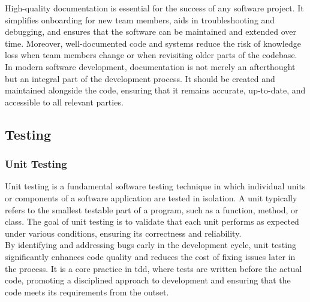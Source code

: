 High-quality documentation is essential for the success of any software project. It simplifies onboarding for new team members, aids in troubleshooting and debugging, and ensures that the software can be maintained and extended over time. Moreover, well-documented code and systems reduce the risk of knowledge loss when team members change or when revisiting older parts of the codebase. \cite{geeksforgeeks:doc} \\

In modern software development, documentation is not merely an afterthought but an integral part of the development process. It should be created and maintained alongside the code, ensuring that it remains accurate, up-to-date, and accessible to all relevant parties.

\subsection{Testing}

\subsubsection*{Unit Testing}



Unit testing is a fundamental software testing technique in which individual units or components of a software application are tested in isolation. A unit typically refers to the smallest testable part of a program, such as a function, method, or class. The goal of unit testing is to validate that each unit performs as expected under various conditions, ensuring its correctness and reliability. \cite{geeksforgeeks:unit-test} \\

By identifying and addressing bugs early in the development cycle, unit testing significantly enhances code quality and reduces the cost of fixing issues later in the process. It is a core practice in \gls{tdd}, where tests are written before the actual code, promoting a disciplined approach to development and ensuring that the code meets its requirements from the outset. \cite{geeksforgeeks:unit-test} \\

